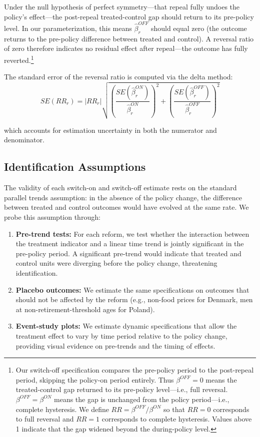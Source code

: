 \documentclass[12pt]{article}
\begin{document}
Under the null hypothesis of perfect symmetry---that repeal fully undoes the policy's effect---the post-repeal treated-control gap should return to its pre-policy level. In our parameterization, this means $\hat{\beta}^{OFF}_r$ should equal zero (the outcome returns to the pre-policy difference between treated and control). A reversal ratio of zero therefore indicates no residual effect after repeal---the outcome has fully reverted.\footnote{Our switch-off specification compares the pre-policy period to the post-repeal period, skipping the policy-on period entirely. Thus $\beta^{OFF} = 0$ means the treated-control gap returned to its pre-policy level---i.e., full reversal. $\beta^{OFF} = \beta^{ON}$ means the gap is unchanged from the policy period---i.e., complete hysteresis. We define $RR = \beta^{OFF}/\beta^{ON}$ so that $RR = 0$ corresponds to full reversal and $RR = 1$ corresponds to complete hysteresis. Values above 1 indicate that the gap widened beyond the during-policy level.}

The standard error of the reversal ratio is computed via the delta method:
\begin{equation}
SE(RR_r) = |RR_r| \sqrt{\left(\frac{SE(\hat{\beta}^{ON}_r)}{\hat{\beta}^{ON}_r}\right)^2 + \left(\frac{SE(\hat{\beta}^{OFF}_r)}{\hat{\beta}^{OFF}_r}\right)^2}
\label{eq:rr_se}
\end{equation}

\noindent which accounts for estimation uncertainty in both the numerator and denominator.

\subsection{Identification Assumptions}

The validity of each switch-on and switch-off estimate rests on the standard parallel trends assumption: in the absence of the policy change, the difference between treated and control outcomes would have evolved at the same rate. We probe this assumption through:

\begin{enumerate}
    \item \textbf{Pre-trend tests:} For each reform, we test whether the interaction between the treatment indicator and a linear time trend is jointly significant in the pre-policy period. A significant pre-trend would indicate that treated and control units were diverging before the policy change, threatening identification.

    \item \textbf{Placebo outcomes:} We estimate the same specifications on outcomes that should not be affected by the reform (e.g., non-food prices for Denmark, men at non-retirement-threshold ages for Poland).

    \item \textbf{Event-study plots:} We estimate dynamic specifications that allow the treatment effect to vary by time period relative to the policy change, providing visual evidence on pre-trends and the timing of effects.
\end{enumerate}
\end{document}
